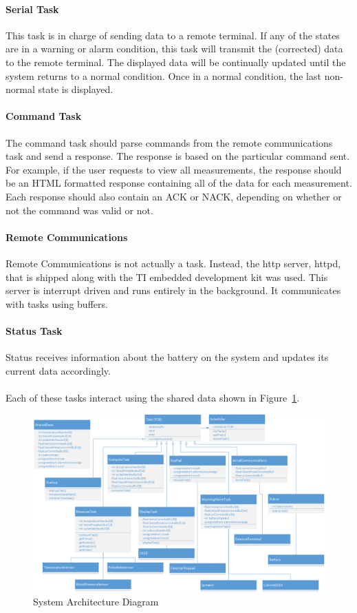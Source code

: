 \documentclass[12pt]{article} %
\begin{document}
    \paragraph{Serial Task} This task is in charge of sending data to
    a remote terminal. If any of the states are in a warning or alarm condition,
		this task will transmit the (corrected) data to the remote terminal. The
		displayed data will be continually updated until the system returns to a
		normal condition. Once in a normal condition, the last non-normal state is
		displayed.

    \paragraph{Command Task} The command task should parse commands from the 
    remote communications task and send a response.  The response is based
    on the particular command sent.  For example, if the user requests to view
    all measurements, the response should be an HTML formatted response
    containing all of the data for each measurement.  Each response should also
    contain an ACK or NACK, depending on whether or not the command was valid or
    not.

    \paragraph{Remote Communications}  Remote Communications is not actually a
    task.  Instead, the http server, httpd, that is shipped along with the TI
    embedded development kit was used.  This server is interrupt driven and
    runs entirely in the background.  It communicates with tasks using buffers.  

    \paragraph{Status Task} Status receives information about the battery on the
    system and updates its current data accordingly.
~\\
~\\
    Each of these tasks interact using the shared data shown in Figure~\ref{fig:arch}. 

    \begin{figure}[h]
      \centering
      \includegraphics[width=\textwidth]{../design/System_Architecture}
      \caption{System Architecture Diagram}
      \label{fig:arch}
    \end{figure}
\end{document}
